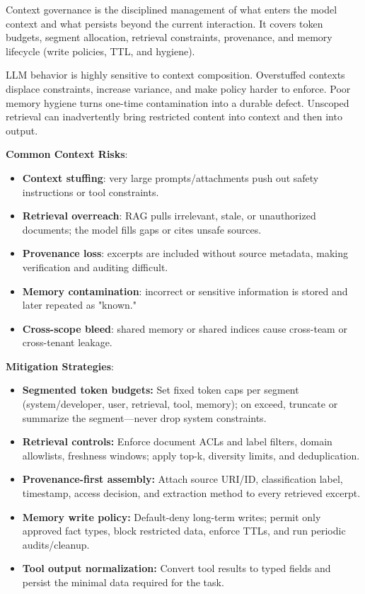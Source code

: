 \begin{TNtwocol}
    Context governance is the disciplined management of what enters the model context and what persists beyond the current interaction. It covers token budgets, segment allocation, retrieval constraints, provenance, and memory lifecycle (write policies, TTL, and hygiene).

    LLM behavior is highly sensitive to context composition. Overstuffed contexts displace constraints, increase variance, and make policy harder to enforce. Poor memory hygiene turns one-time contamination into a durable defect. Unscoped retrieval can inadvertently bring restricted content into context and then into output.

    \textbf{Common Context Risks}:
    \begin{itemize}
        \item \textbf{Context stuffing}: very large prompts/attachments push out safety instructions or tool constraints.
        \item \textbf{Retrieval overreach}: RAG pulls irrelevant, stale, or unauthorized documents; the model fills gaps or cites unsafe sources.
        \item \textbf{Provenance loss}: excerpts are included without source metadata, making verification and auditing difficult.
        \item \textbf{Memory contamination}: incorrect or sensitive information is stored and later repeated as "known."
        \item \textbf{Cross-scope bleed}: shared memory or shared indices cause cross-team or cross-tenant leakage.
    \end{itemize}

    \textbf{Mitigation Strategies}:
    \begin{itemize}
        \item \textbf{Segmented token budgets:} Set fixed token caps per segment (system/developer, user, retrieval, tool, memory); on exceed, truncate or summarize the segment—never drop system constraints.
        \item \textbf{Retrieval controls:} Enforce document ACLs and label filters, domain allowlists, freshness windows; apply top-k, diversity limits, and deduplication.
        \item \textbf{Provenance-first assembly:} Attach source URI/ID, classification label, timestamp, access decision, and extraction method to every retrieved excerpt.
        \item \textbf{Memory write policy:} Default-deny long-term writes; permit only approved fact types, block restricted data, enforce TTLs, and run periodic audits/cleanup.
        \item \textbf{Tool output normalization:} Convert tool results to typed fields and persist the minimal data required for the task.
    \end{itemize}


\end{TNtwocol}
